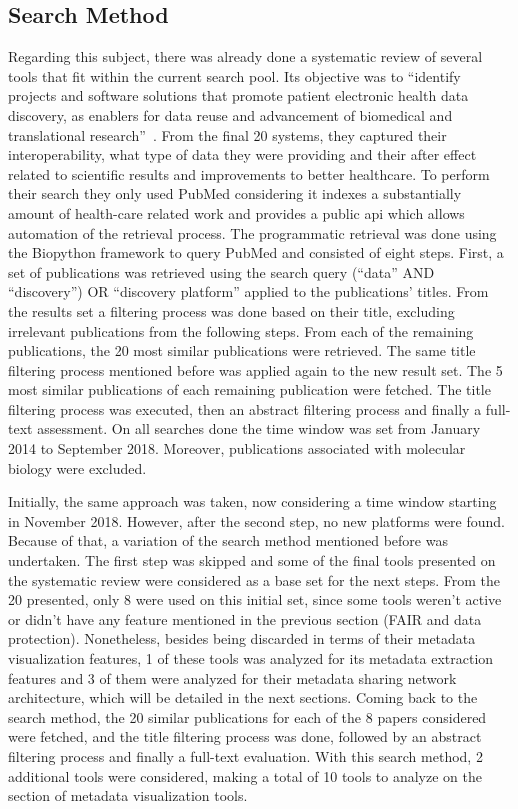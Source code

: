 \subsection{Search Method}

Regarding this subject, there was already done a systematic review of several tools that fit within the current search pool.
Its objective was to ``identify projects and software solutions that promote patient electronic health data discovery, as enablers for data reuse and advancement of biomedical and translational research''~\cite{systematic_review}.
From the final 20 systems, they captured their interoperability, what type of data they were providing and their after effect related to scientific results and improvements to better healthcare.
To perform their search they only used PubMed  considering it indexes a substantially amount of health-care related work and provides a public \gls{api} which allows automation of the retrieval process.
The programmatic retrieval was done using the Biopython framework to query PubMed and consisted of eight steps.
First, a set of publications was retrieved using the search query (``data'' AND ``discovery'') OR ``discovery platform'' applied to the publications' titles.
From the results set a filtering process was done based on their title, excluding irrelevant publications from the following steps.
From each of the remaining publications, the 20 most similar publications were retrieved.
The same title filtering process mentioned before was applied again to the new result set.
The 5 most similar publications of each remaining publication were fetched.
The title filtering process was executed, then an abstract filtering process and finally a full-text assessment.
On all searches done the time window was set from January 2014 to September 2018.
Moreover, publications associated with molecular biology were excluded.

Initially, the same approach was taken, now considering a time window starting in November 2018.
However, after the second step, no new platforms were found.
Because of that, a variation of the search method mentioned before was undertaken.
The first step was skipped and some of the final tools presented on the systematic review were considered as a base set for the next steps.
From the 20 presented, only 8 were used on this initial set, since some tools weren't active or didn't have any feature mentioned in the previous section (FAIR and data protection).
Nonetheless, besides being discarded in terms of their metadata visualization features, 1 of these tools was analyzed for its metadata extraction features and 3 of them were analyzed for their metadata sharing network architecture, which will be detailed in the next sections.
Coming back to the search method, the 20 similar publications for each of the 8 papers considered were fetched, and the title filtering process was done, followed by an abstract filtering process and finally a full-text evaluation.
With this search method, 2 additional tools were considered, making a total of 10 tools to analyze on the section of metadata visualization tools.

